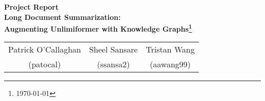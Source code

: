 \begin{center}
\large
\textbf{Project Report}\\
\Large
\textbf{Long Document Summarization:}\\
\textbf{Augmenting Unlimiformer with Knowledge Graphs\footnote{\today}}\\
\begin{table}[h]
    \centering
    \begin{tabular}{ccc}
        Patrick O'Callaghan&  Sheel Sansare& Tristan Wang\\
         (patocal)& (ssansa2)  & (aawang99)\\
    \end{tabular}
    \label{tab:my_label}
\end{table}
\end{center}
